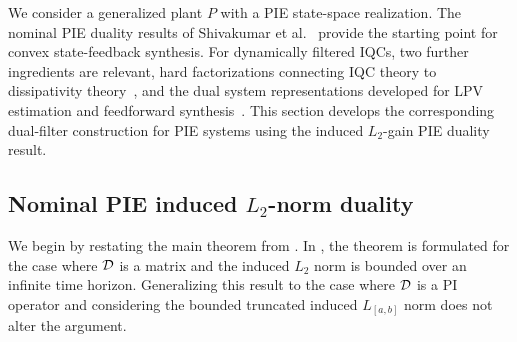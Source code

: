 We consider a generalized plant $P$ with a PIE state-space realization.
The nominal PIE duality results of Shivakumar et al.~\cite{shivaknew}
provide the starting point for convex state-feedback synthesis.
For dynamically filtered IQCs, two further ingredients are relevant,
hard factorizations connecting IQC theory to
dissipativity theory~\cite{9781263,6915700,scherer2018dynamicdissipation}, and the dual system representations
developed for LPV estimation and feedforward
synthesis~\cite{kose2009robust,venkataraman}.
This section develops the corresponding dual-filter construction for PIE
systems using the induced $L_2$-gain PIE duality result.

\subsection{Nominal PIE induced $L_2$-norm duality}\label{sec:dynamic-filtering-duality-1}
We begin by restating the main theorem from \cite{shivaknew}. In \cite{shivaknew}, 
the theorem is formulated for the case where $\mathcal{D}$ is a matrix and the 
induced $L_2$ norm is bounded over an infinite time horizon. Generalizing this result 
to the case where $\mathcal{D}$ is a PI operator and considering the bounded truncated 
induced $L_{[a,b]}$ norm does not alter the argument.


